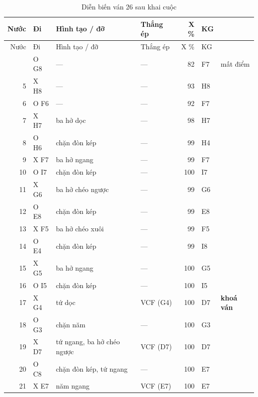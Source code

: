 \par{\scriptsize
\renewcommand{\arraystretch}{0.95}
\begin{longtable}{rlp{4.4cm}lrll}
  \caption{Diễn biến ván 26 sau khai cuộc}\label{tab:cs-vs-26}\\
    \toprule
    Nước & Đi & Hình tạo / đỡ & Thắng ép & X \% & KG &  \\
    \midrule
  \endfirsthead
    \toprule
    Nước & Đi & Hình tạo / đỡ & Thắng ép & X \% & KG &  \\
    \midrule
  \endhead
    \bottomrule
  \endfoot
    4 & O G8 & --- & --- & 82 & F7 & mất điểm \\
    5 & X H8 & --- & --- & 93 & H8 &  \\
    6 & O F6 & --- & --- & 92 & F7 &  \\
    7 & X H7 & ba hở dọc & --- & 98 & H7 &  \\
    8 & O H6 & chặn đòn kép & --- & 99 & H4 &  \\
    9 & X F7 & ba hở ngang & --- & 99 & F7 &  \\
    10 & O I7 & chặn đòn kép & --- & 100 & I7 &  \\
    11 & X G6 & ba hở chéo ngược & --- & 99 & G6 &  \\
    12 & O E8 & chặn đòn kép & --- & 99 & E8 &  \\
    13 & X F5 & ba hở chéo xuôi & --- & 99 & F5 &  \\
    14 & O E4 & chặn đòn kép & --- & 99 & I8 &  \\
    15 & X G5 & ba hở ngang & --- & 100 & G5 &  \\
    16 & O I5 & chặn đòn kép & --- & 100 & I5 &  \\
    17 & X G4 & tứ dọc & VCF (G4) & 100 & D7 & \textbf{khoá ván} \\
    18 & O G3 & chặn năm & --- & 100 & G3 &  \\
    19 & X D7 & tứ ngang, ba hở chéo ngược & VCF (D7) & 100 & D7 &  \\
    20 & O C8 & chặn đòn kép, tứ ngang & --- & 100 & E7 &  \\
    21 & X E7 & năm ngang & VCF (E7) & 100 & E7 &  \\
\end{longtable}
}
